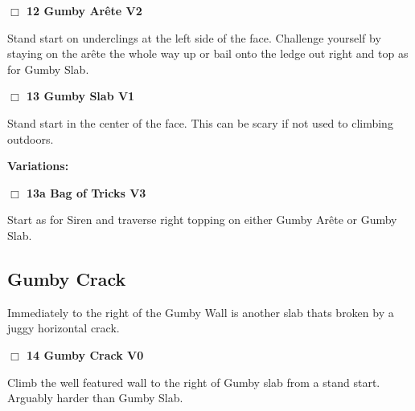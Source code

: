 	\begin{multicols}{2}


\needspace{1.5cm}
\label{rt:Gumby Arête}
\colorbox{green!20}{
\parbox{0.95\linewidth}{
\hspace{-1ex}\textbf{$\Box$
12 Gumby Arête V2  
}}}
\begin{adjustwidth}{1.3em}{}			
Stand start on underclings at the left side of the face. Challenge yourself by staying on the arête the whole way up or bail onto the ledge out right and top as for Gumby Slab.
\end{adjustwidth}




\needspace{1.5cm}
\label{rt:Gumby Slab}
\colorbox{green!20}{
\parbox{0.95\linewidth}{
\hspace{-1ex}\textbf{$\Box$
13 Gumby Slab V1  
}}}
\begin{adjustwidth}{1.3em}{}			
Stand start in the center of the face. This can be scary if not used to climbing outdoors.
\end{adjustwidth}


\begin{adjustwidth}{0.5cm}{}				
\needspace{3cm}
\textbf{Variations:} \newline

\needspace{1.5cm}
\label{vr:Bag of Tricks}
\colorbox{green!20}{
\parbox{0.95\linewidth}{
\hspace{-1ex}\textbf{$\Box$
13a Bag of Tricks V3  
}}}
\begin{adjustwidth}{1.3em}{}			
Start as for Siren and traverse right topping on either Gumby Arête or Gumby Slab.
\end{adjustwidth}



\end{adjustwidth}



\needspace{1.5cm}
\subsection*{Gumby Crack}\label{bf:Gumby Crack}
Immediately to the right of the Gumby Wall is another slab thats broken by a juggy horizontal crack.\\
	


\needspace{1.5cm}
\label{rt:Gumby Crack}
\colorbox{green!20}{
\parbox{0.95\linewidth}{
\hspace{-1ex}\textbf{$\Box$
14 Gumby Crack V0  
}}}
\begin{adjustwidth}{1.3em}{}			
Climb the well featured wall to the right of Gumby slab from a stand start. Arguably harder than Gumby Slab.
\end{adjustwidth}






\end{multicols}
